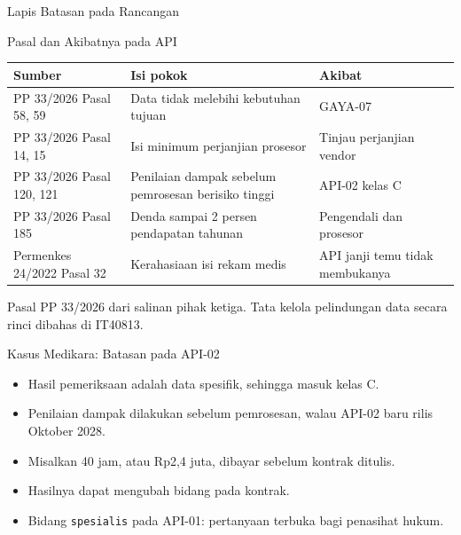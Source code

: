 \documentclass[aspectratio=169, table, 12pt]{beamer}
\begin{document}
\begin{frame}{{\Large Lapis Batasan pada Rancangan}}
  \centering
\end{frame}

\begin{frame}{{\Large Pasal dan Akibatnya pada API}}
  \footnotesize
  \begin{tabularx}{\textwidth}{>{\raggedright\arraybackslash}p{3.0cm} >{\raggedright\arraybackslash}X >{\raggedright\arraybackslash}X}
    \hline
    \textbf{Sumber} & \textbf{Isi pokok} & \textbf{Akibat} \\ \hline
    PP 33/2026 Pasal 58, 59 & Data tidak melebihi kebutuhan tujuan & GAYA-07 \\ \hline
    PP 33/2026 Pasal 14, 15 & Isi minimum perjanjian prosesor & Tinjau perjanjian vendor \\ \hline
    PP 33/2026 Pasal 120, 121 & Penilaian dampak sebelum pemrosesan berisiko tinggi & API-02 kelas C \\ \hline
    PP 33/2026 Pasal 185 & Denda sampai 2 persen pendapatan tahunan & Pengendali dan prosesor \\ \hline
    Permenkes 24/2022 Pasal 32 & Kerahasiaan isi rekam medis & API janji temu tidak membukanya \\ \hline
  \end{tabularx}

  \vspace{6pt}
  \small Pasal PP 33/2026 dari salinan pihak ketiga. Tata kelola pelindungan data secara rinci dibahas di IT40813.
\end{frame}

\begin{frame}{{\Large Kasus Medikara: Batasan pada API-02}}
  \vspace{6pt}
  \begin{itemize}
    \item Hasil pemeriksaan adalah data spesifik, sehingga masuk kelas C.
    \item Penilaian dampak dilakukan sebelum pemrosesan, walau API-02 baru rilis Oktober 2028.
    \item Misalkan 40 jam, atau Rp2,4 juta, dibayar sebelum kontrak ditulis.
    \item Hasilnya dapat mengubah bidang pada kontrak.
    \item Bidang \texttt{spesialis} pada API-01: pertanyaan terbuka bagi penasihat hukum.
  \end{itemize}
\end{frame}
\end{document}
